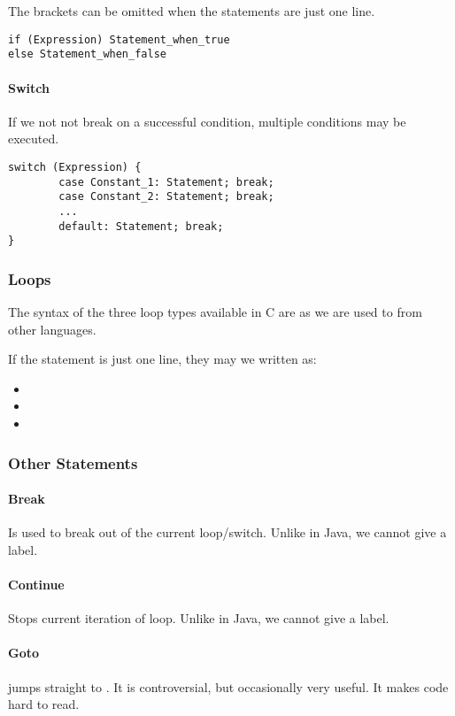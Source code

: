 The brackets can be omitted when the statements are just one line.
\begin{lstlisting}
if (Expression) Statement_when_true
else Statement_when_false
\end{lstlisting}

\paragraph{Switch}
If we not not break on a successful condition, multiple conditions may be executed.
\begin{lstlisting}
switch (Expression) {
        case Constant_1: Statement; break;
        case Constant_2: Statement; break;
        ...
        default: Statement; break;
}
\end{lstlisting}

\subsubsection{Loops}
The syntax of the three loop types available in C are as we are used to from other languages. 

If the statement is just one line, they may we written as:
\begin{itemize}
    \item {}
    \item {}
    \item {}
\end{itemize}

\subsubsection{Other Statements}

\paragraph{Break}
Is used to break out of the current loop/switch. Unlike in Java, we cannot give a label.

\paragraph{Continue}
Stops current iteration of loop. Unlike in Java, we cannot give a label.

\paragraph{Goto}
 jumps straight to . It is controversial, but occasionally very useful. It makes code hard to read.

